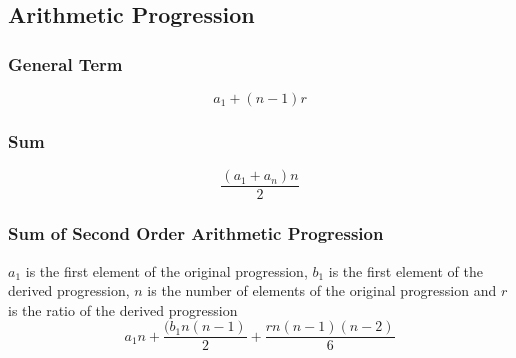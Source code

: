\subsection{Arithmetic Progression}
\subsubsection{General Term}
$$ a_{1} + (n - 1) r $$
\subsubsection{Sum}
$$ \dfrac{(a_{1} + a_{n}) n}{2} $$
\subsubsection{Sum of Second Order Arithmetic Progression}
$a_{1}$ is the first element of the original progression, $b_{1}$ is the first element of the derived progression, $n$ is the number of elements of the original progression and $r$ is the ratio of the derived progression
$$ a_{1} n + \dfrac{(b_{1} n (n - 1)}{2} + \dfrac{r n (n - 1) (n - 2)}{6} $$